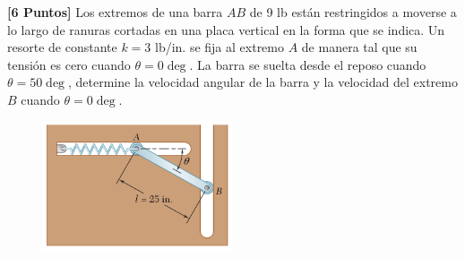 \documentclass[ a4paper, twoside, 11pt]{article}
\begin{document}
\begin{problem}
\textbf{[6 Puntos]} Los extremos de una barra $AB$ de 9 lb est\'an restringidos a moverse a lo largo de ranuras cortadas en una placa vertical en la forma que se indica. Un resorte de constante $k = 3$ lb/in. se fija al extremo $A$ de manera tal que su tensi\'on es cero cuando $\theta = 0\deg$. La barra se suelta desde el reposo cuando $\theta = 50\deg$, determine la velocidad angular de la barra y la velocidad del extremo $B$ cuando $\theta = 0\deg$. 

\begin{figure}[htb]
\centering
\includegraphics[width=0.5\textwidth]{problema-03.jpg}
\end{figure}

\end{problem}
\fullskip
\end{document}
